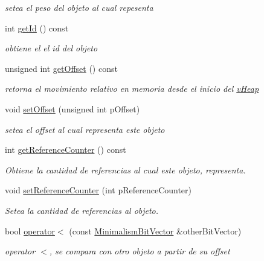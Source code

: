 \begin{DoxyCompactItemize}
\begin{DoxyCompactList}\small\item\em setea el peso del objeto al cual repesenta \end{DoxyCompactList}\item 
int \hyperlink{class_minimalism_bit_vector_a166c2b2c6e84945e329310584ca89128}{get\-Id} () const 
\begin{DoxyCompactList}\small\item\em obtiene el el id del objeto \end{DoxyCompactList}\item 
unsigned int \hyperlink{class_minimalism_bit_vector_ae17a440748037ed78b67bf9a2f4aad1d}{get\-Offset} () const 
\begin{DoxyCompactList}\small\item\em retorna el movimiento relativo en memoria desde el inicio del \hyperlink{classv_heap}{v\-Heap} \end{DoxyCompactList}\item 
void \hyperlink{class_minimalism_bit_vector_ad9d6993d2a24b1f238f1896dd8ff04be}{set\-Offset} (unsigned int p\-Offset)
\begin{DoxyCompactList}\small\item\em setea el offset al cual representa este objeto \end{DoxyCompactList}\item 
int \hyperlink{class_minimalism_bit_vector_ab0c91d2ff39599b96ba7f0c52ed796d2}{get\-Reference\-Counter} () const 
\begin{DoxyCompactList}\small\item\em Obtiene la cantidad de referencias al cual este objeto, representa. \end{DoxyCompactList}\item 
void \hyperlink{class_minimalism_bit_vector_af65272b7663cfc96d2a8fd16668b8570}{set\-Reference\-Counter} (int p\-Reference\-Counter)
\begin{DoxyCompactList}\small\item\em Setea la cantidad de referencias al objeto. \end{DoxyCompactList}\item 
bool \hyperlink{class_minimalism_bit_vector_ab6073c581675be3a1a8837aea19babb0}{operator$<$} (const \hyperlink{class_minimalism_bit_vector}{Minimalism\-Bit\-Vector} \&other\-Bit\-Vector)
\begin{DoxyCompactList}\small\item\em operator $<$, se compara con otro objeto a partir de su offset \end{DoxyCompactList}\item 

\end{DoxyCompactItemize}
